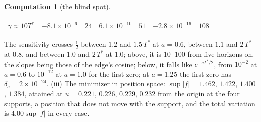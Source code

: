 \documentclass[11pt]{article}
\theoremstyle{definition}
\newtheorem{computation}[theorem]{Computation}
\theoremstyle{remark}
\newcommand{\Tst}{T^{*}}
\begin{document}
\begin{computation}[the blind spot]
\begin{center}
\begin{tabular}{@{}l|cc|cc|cc@{}}
$\gamma\approx10\Tst$ & $-8.1\times10^{-6}$ & $24$ & $6.1\times10^{-10}$ & $51$ & $-2.8\times10^{-16}$ & $108$\\
\bottomrule
\end{tabular}
\end{center}
\noindent The sensitivity crosses $\tfrac12$ between $1.2$ and $1.5\,\Tst$ at $a=0.6$, between $1.1$ and $2\,\Tst$ at $0.8$, and between $1.0$ and $2\,\Tst$ at $1.0$; above, it is $10$--$100$ from five horizons on, the slopes being those of the edge's cosine; below, it falls like $e^{-c\Tst/2}$, from $10^{-2}$ at $a=0.6$ to $10^{-12}$ at $a=1.0$ for the first zero; at $a=1.25$ the first zero has $\delta_c=2\times10^{-24}$. (iii) The minimizer in position space: $\sup|f|=1.462$, $1.422$, $1.400$, $1.384$, attained at $u=0.221$, $0.226$, $0.229$, $0.232$ from the origin at the four supports, a position that does not move with the support, and the total variation is $4.00\sup|f|$ in every case.
\end{computation}
\end{document}
